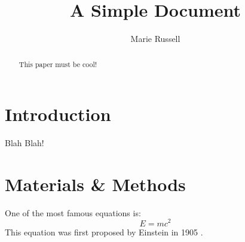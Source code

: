 \documentclass[pt]{article}
\title{A Simple Document}
\author{Marie Russell}
\date{}
\begin{document}
	\maketitle
	
	\begin{abstract}
		This paper must be cool!
	\end{abstract}
	
	\section{Introduction}
		Blah Blah!
		
	\section{Materials \& Methods}
	One of the most famous equations is:
	\begin{equation}
		E = mc^2
	\end{equation}
	This equation was first proposed by Einstein in 1905
	\cite{einstein1905does}.
	
	
	
\end{document}
